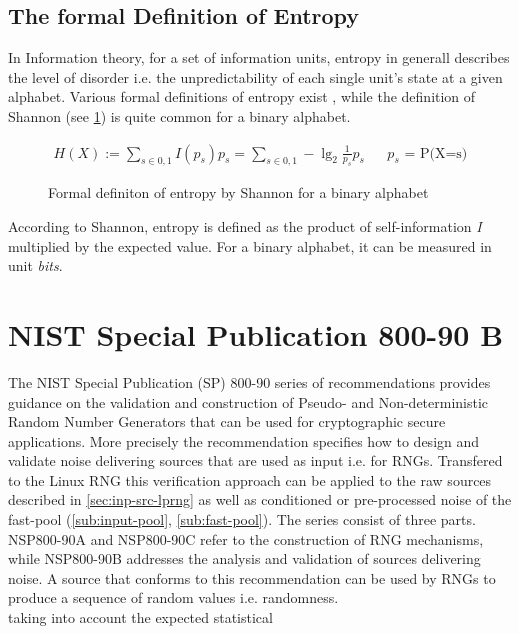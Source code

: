 \subsection{The formal Definition of Entropy}
In Information theory, for a set of information units, entropy in generall describes the level of disorder i.e. the unpredictability of each single unit's state at a given alphabet. Various formal definitions of entropy exist \cite{hagerty2012entropy}, while the definition of Shannon (see \ref{fig:form-entropy-shan}) is quite common for a binary alphabet. 

\begin{figure}[H]
	\begin{align*}
	\displaystyle H(X) := \sum_{s \in {0,1}} I(p_s) p_s = \sum_{s \in {0,1}} -\lg_2 \frac{1}{p_s} p_s && \text{$p_s$ = P(X=s)}
	\end{align*}
	\caption{Formal definiton of entropy by Shannon for a binary alphabet}
	\label{fig:form-entropy-shan}
\end{figure}
According to Shannon, entropy is defined as the product of self-information \textit{I} multiplied by the expected value. For a binary alphabet, it can be measured in unit \textit{bits}. 



\section{NIST Special Publication 800-90 B}

The NIST Special Publication (SP) 800-90 series of recommendations provides 
guidance on the validation and construction of Pseudo- and Non-deterministic Random Number Generators that can be used for cryptographic secure applications. More precisely the recommendation specifies how to design and validate noise delivering sources that are used as input i.e. for RNGs. Transfered to the Linux RNG this verification approach can be applied to the raw sources described in \ref{sec:inp-src-lprng} as well as conditioned or pre-processed noise of the  
fast-pool (\ref{sub:input-pool}, \ref{sub:fast-pool}). The series consist of three parts. NSP800-90A and NSP800-90C refer to the construction of RNG mechanisms, while NSP800-90B addresses the analysis and validation of sources delivering noise. A source that conforms to this recommendation can be used by RNGs to produce a sequence of random values \cite{rukhin2010nist} i.e. randomness.\\


 taking into account the
 expected statistical 

